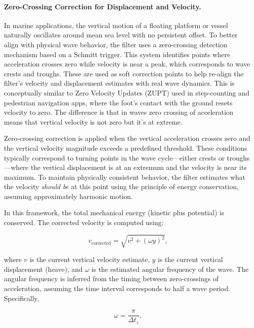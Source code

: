 \documentclass[11pt,letterpaper]{article}
\begin{document}
\paragraph{Zero-Crossing Correction for Displacement and Velocity.}
In marine applications, the vertical motion of a floating platform or vessel naturally oscillates around mean sea level with no persistent offset. To better align with physical wave behavior, the filter uses a zero-crossing detection mechanism based on a Schmitt trigger. This system identifies points where acceleration crosses zero while velocity is near a peak, which corresponds to wave crests and troughs. These are used as soft correction points to help re-align the filter’s velocity and displacement estimates with real wave dynamics. This is conceptually similar to Zero Velocity Updates (ZUPT) used in step-counting and pedestrian navigation apps, where the foot’s contact with the ground resets velocity to zero. The difference is that in waves zero crossing of acceleration means that vertical velocity is not zero but it's at extreme.

Zero-crossing correction is applied when the vertical acceleration crosses zero and the vertical velocity magnitude exceeds a predefined threshold. These conditions typically correspond to turning points in the wave cycle—either crests or troughs—where the vertical displacement is at an extremum and the velocity is near its maximum. To maintain physically consistent behavior, the filter estimates what the velocity \emph{should be} at this point using the principle of energy conservation, assuming approximately harmonic motion.

In this framework, the total mechanical energy (kinetic plus potential) is conserved. The corrected velocity is computed using:

\begin{equation}
v_{\text{corrected}} = \sqrt{v^2 + (\omega y)^2},
\end{equation}

where \( v \) is the current vertical velocity estimate, \( y \) is the current vertical displacement (heave), and \( \omega \) is the estimated angular frequency of the wave. The angular frequency is inferred from the timing between zero-crossings of acceleration, assuming the time interval corresponds to half a wave period. Specifically,

\begin{equation}
\omega = \frac{\pi}{\Delta t_{z}},
\end{equation}
\end{document}
